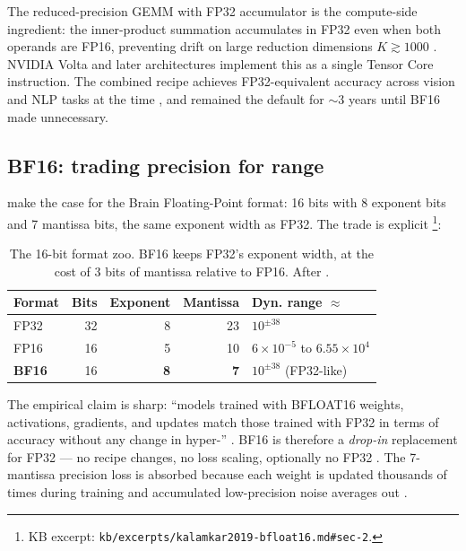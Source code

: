 The reduced-precision GEMM with FP32 accumulator is the compute-side
ingredient: the inner-product summation accumulates in FP32 even when
both operands are FP16, preventing drift on large reduction dimensions
$K \gtrsim 1000$ \citep[\S 4]{micikevicius2017-mixed-precision}. NVIDIA
Volta and later architectures implement this as a single Tensor Core
instruction. The combined recipe achieves FP32-equivalent accuracy
across vision and NLP tasks at the time
\citep[\S 5]{micikevicius2017-mixed-precision}, and remained the
default for $\sim$3 years until BF16 made  unnecessary.

\subsection{BF16: trading precision for range}
\label{sec:mp-bf16}

\citet{kalamkar2019-bfloat16} make the case for the Brain
Floating-Point format: 16 bits with 8 exponent bits and 7 mantissa
bits, the same exponent width as FP32. The trade is explicit
\citep[\S 2]{kalamkar2019-bfloat16}\footnote{KB excerpt:
\texttt{kb/excerpts/kalamkar2019-bfloat16.md\#sec-2}.}:

\begin{table}[h]
\centering
\small
\begin{tabular}{lrrrl}
\toprule
Format & Bits & Exponent & Mantissa & Dyn. range $\approx$ \\
\midrule
FP32 & 32 & 8  & 23 & $10^{\pm 38}$ \\
FP16 & 16 & 5  & 10 & $6\times 10^{-5}$ to $6.55\times 10^{4}$ \\
\textbf{BF16} & 16 & \textbf{8} & \textbf{7} & $10^{\pm 38}$ (FP32-like) \\
\bottomrule
\end{tabular}
\caption{The 16-bit format zoo. BF16 keeps FP32's exponent width, at
the cost of 3 bits of mantissa relative to FP16. After
\citet[\S 2]{kalamkar2019-bfloat16}.}
\label{tab:fp16-bf16-fp32}
\end{table}

The empirical claim is sharp: ``models trained with BFLOAT16 weights,
activations, gradients, and updates match those trained with FP32 in
terms of accuracy without any change in hyper-''
\citep[\S 4]{kalamkar2019-bfloat16}. BF16 is therefore a
\emph{drop-in} replacement for FP32 — no recipe changes, no loss
scaling, optionally no FP32 . The 7-mantissa precision
loss is absorbed because each weight is updated thousands of times
during training and accumulated low-precision noise averages out
\citep[\S 3]{kalamkar2019-bfloat16}.

